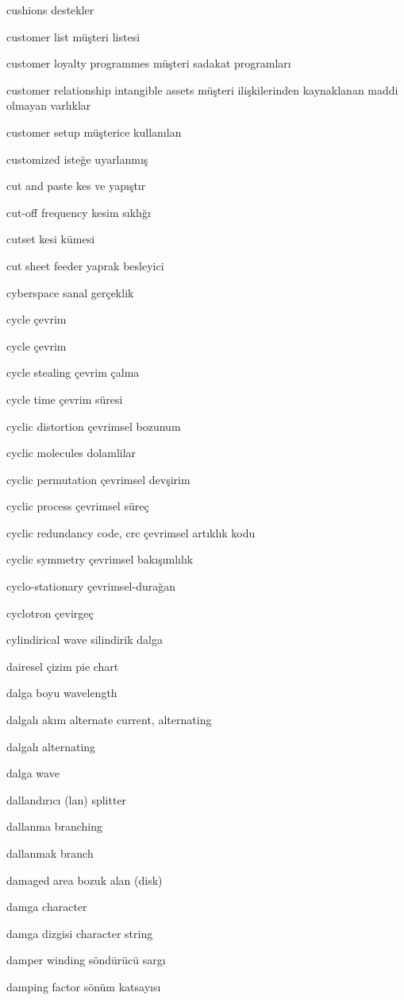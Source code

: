 \documentclass[12pt,fleqn]{article}\usepackage{../../common}
\begin{document}
cushions destekler

customer list müşteri listesi

customer loyalty programmes müşteri sadakat programları

customer relationship intangible assets müşteri ilişkilerinden kaynaklanan maddi olmayan varlıklar

customer setup müşterice kullanılan

customized isteğe uyarlanmış

cut and paste kes ve yapıştır

cut-off frequency kesim sıklığı

cutset kesi kümesi

cut sheet feeder yaprak besleyici

cyberspace sanal gerçeklik

cycle çevrim

cycle çevrim

cycle stealing çevrim çalma

cycle time çevrim süresi

cyclic distortion çevrimsel bozunum

cyclic molecules dolamlilar

cyclic permutation çevrimsel devşirim

cyclic process çevrimsel süreç

cyclic redundancy code, crc çevrimsel artıklık kodu

cyclic symmetry çevrimsel bakışımlılık

cyclo-stationary çevrimsel-durağan

cyclotron çevirgeç

cylindirical wave silindirik dalga

dairesel çizim pie chart

dalga boyu wavelength

dalgalı akım alternate current, alternating

dalgalı alternating

dalga wave

dallandırıcı (lan) splitter

dallanma branching

dallanmak branch

damaged area bozuk alan (disk)

damga character

damga dizgisi character string

damper winding söndürücü sargı

damping factor sönüm katsayısı
\end{document}
